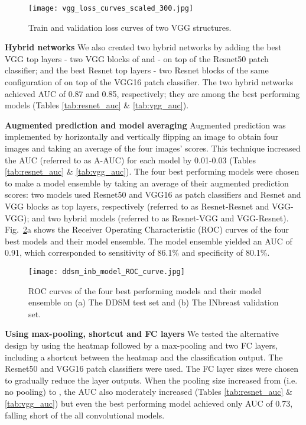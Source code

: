 \documentclass[12pt,letterpaper]{article}
\begin{document}
\begin{figure}
  \centering
  \texttt{[image: vgg\_loss\_curves\_scaled\_300.jpg]}
  \caption{Train and validation loss curves of two VGG structures.}
  \label{fig:vgg_loss}
\end{figure}


\textbf{Hybrid networks}
\label{hybrid_auc}
We also created two hybrid networks by adding the best VGG top layers - two VGG blocks of  and  - on top of the Resnet50 patch classifier; and the best Resnet top layers - two Resnet blocks of the same configuration of  on top of the VGG16 patch classifier. The two hybrid networks achieved AUC of 0.87 and 0.85, respectively; they are among the best performing models (Tables \ref{tab:resnet_auc} \& \ref{tab:vgg_auc}).

\textbf{Augmented prediction and model averaging}
\label{augmented_ensemble}
Augmented prediction was implemented by horizontally and vertically flipping an image to obtain four images and taking an average of the four images' scores. This technique increased the AUC (referred to as A-AUC) for each model by 0.01-0.03 (Tables \ref{tab:resnet_auc} \& \ref{tab:vgg_auc}). The four best performing models were chosen to make a model ensemble by taking an average of their augmented prediction scores: two models used Resnet50 and VGG16 as patch classifiers and Resnet and VGG blocks as top layers, respectively (referred to as Resnet-Resnet and VGG-VGG); and two hybrid models (referred to as Resnet-VGG and VGG-Resnet). Fig.~\ref{fig:roc_curve}a shows the Receiver Operating Characteristic (ROC) curves of the four best models and their model ensemble. The model ensemble yielded an AUC of 0.91, which corresponded to sensitivity of 86.1\% and specificity of 80.1\%.

\begin{figure}
  \centering
  \texttt{[image: ddsm\_inb\_model\_ROC\_curve.jpg]}
  \caption{ROC curves of the four best performing models and their model ensemble on (a) The DDSM test set and (b) The INbreast validation set.}
  \label{fig:roc_curve}
\end{figure}

\textbf{Using max-pooling, shortcut and FC layers}
\label{pool_fc_auc}
We tested the alternative design by using the heatmap followed by a max-pooling and two FC layers, including a shortcut between the heatmap and the classification output. The Resnet50 and VGG16 patch classifiers were used. The FC layer sizes were chosen to gradually reduce the layer outputs. When the pooling size increased from  (i.e. no pooling) to , the AUC also moderately increased (Tables \ref{tab:resnet_auc} \& \ref{tab:vgg_auc}) but even the best performing model achieved only AUC of 0.73, falling short of the all convolutional models.
\end{document}
